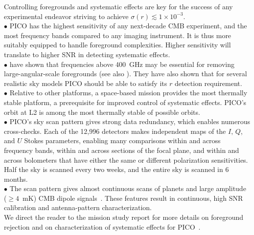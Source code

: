 \documentclass[PICOAPC.tex]{subfiles}
\begin{document}
Controlling foregrounds and systematic effects are key for the success of any experimental endeavor striving to achieve $\sigma(r) \lesssim 1 \times 10^{-3}$. \\
$\bullet$ \hspace{0.1in}  PICO has the highest sensitivity of any next-decade CMB experiment, and the most frequency bands compared to any imaging instrument. It is thus more suitably equipped to handle foreground complexities. Higher sensitivity will translate to higher \ac{SNR} in detecting systematic effects. \\ 
$\bullet$ \hspace{0.1in}  \citet{pico_report} have shown that frequencies above 400~GHz may be essential for removing large-angular-scale foregrounds (see also \citet{hensley_2017}). They have also shown that for several realistic sky models PICO should be able to satisfy its $r$ detection requirement.  \\
$\bullet$ \hspace{0.1in}  Relative to other platforms, a space-based mission provides the most thermally stable platform,  a prerequisite for improved control of systematic effects. PICO's orbit at L2 is among the most thermally stable of possible orbits. \\
$\bullet$ \hspace{0.1in} PICO's sky scan pattern gives strong data redundancy, which enables numerous cross-checks. Each of the 12,996 detectors makes independent maps of the $I,\,Q$, and $U$ Stokes parameters, enabling many comparisons within and across frequency bands, within and across sections of the focal plane, and within and across bolometers that have either the same or different polarization sensitivities. Half the sky is scanned every two weeks, and the entire sky is scanned in 6 months. \\
$\bullet$ \hspace{0.1in}  The scan pattern gives almost continuous scans of planets and large amplitude ($\geq 4$~mK) CMB dipole signals~\citep{picoweb_dipole}. These features result in continuous, high \ac{SNR} calibration and antenna-pattern characterization. \\
We direct the reader to the mission study report for more details on foreground rejection and on characterization of systematic effects for PICO~\citep{pico_report}.
\end{document}

